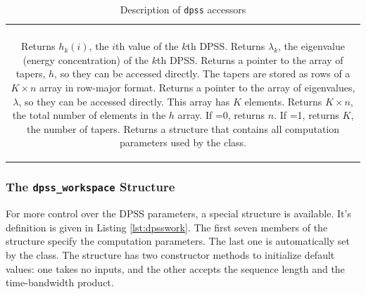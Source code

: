 \begin{table}[!htb]    
    \caption{ Description of \texttt{dpss} accessors \label{tbl:dpssaccess} }
    \vspace*{-0.75em}

    \begin{tabular}{c}
        \hline\hline\\[-0.75em]
        \small
        \parbox{\textwidth-12pt}{
            \vspace*{-0.5em}
            \begin{compactcodelist}
                 Returns $h_k(i)$, the $i$th value of the $k$th DPSS.
                 Returns $\lambda_k$, the eigenvalue (energy concentration) of the $k$th DPSS.
                 Returns a pointer to the array of tapers, $h$, so they can be accessed directly.  The tapers are stored as rows of a $K\times n$ array in row-major format.
                 Returns a pointer to the array of eigenvalues, $\lambda$, so they can be accessed directly.  This array has $K$ elements.
                  Returns $K\times n$, the total number of elements in the $h$ array.
                 If =0, returns $n$.  If =1, returns $K$, the number of tapers.
                 Returns a structure that contains all computation parameters used by the  class.
            \end{compactcodelist}
        }\\
        \hline
   \end{tabular}
    \vspace*{-2em}

\end{table}


\subsubsection{The \texttt{dpss\_workspace} Structure}

For more control over the DPSS parameters, a special  structure is available.  It's definition is given in Listing \ref{lst:dpsswork}.  The first seven members of the structure specify the computation parameters.  The last one is automatically set by the  class.  The structure has two constructor methods to initialize default values: one takes no inputs, and the other accepts the sequence length and the time-bandwidth product.
\smallskip

